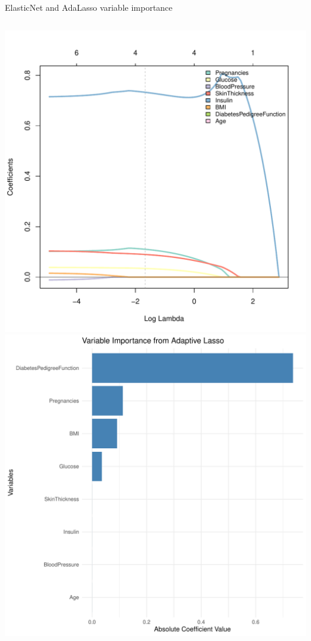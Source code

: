 \begin{frame}{ElasticNet and AdaLasso variable importance}
\begin{columns}[T]
\begin{column}{0.5\textwidth}
\includegraphics[width=0.85\columnwidth]{./Figures/logist/diabetes_adalasso.pdf}
\includegraphics[width=0.7\columnwidth]{./Figures/logist/variable_importance_adalasso.pdf}
\end{column}
\end{columns}

\end{frame}

